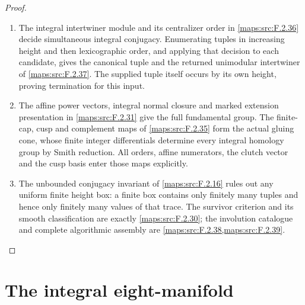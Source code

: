 \begin{proof}
\begin{enumerate}[label=\arabic*.]
\item The integral intertwiner module and its centralizer order in
\cref{maps:src:F.2.36} decide simultaneous integral conjugacy. Enumerating
tuples in increasing height and then lexicographic order, and applying
that decision to each candidate, gives the canonical tuple and the
returned unimodular intertwiner of \cref{maps:src:F.2.37}. The supplied
tuple itself occurs by its own height, proving termination for this input.
\item The affine power vectors, integral normal closure and marked
extension presentation in \cref{maps:src:F.2.31} give the full fundamental
group. The finite-cap, cusp and complement maps of
\cref{maps:src:F.2.35} form the actual gluing cone, whose finite integer
differentials determine every integral homology group by Smith reduction.
All orders, affine numerators, the clutch vector and the cusp basis enter
those maps explicitly.
\item The unbounded conjugacy invariant of \cref{maps:src:F.2.16}
rules out any uniform finite height box: a finite box contains only
finitely many tuples and hence only finitely many values of that trace.
The survivor criterion and its smooth classification are exactly
\cref{maps:src:F.2.30}; the involution catalogue and complete algorithmic
assembly are \cref{maps:src:F.2.38,maps:src:F.2.39}.
\end{enumerate}
\end{proof}



\section{The integral eight-manifold}



